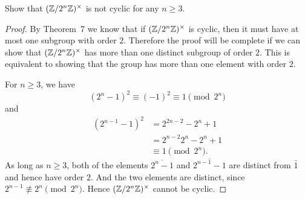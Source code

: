  Show that $(\mathbb{Z}/2^n\mathbb{Z})^\times$ is not cyclic for any
$n\geq3$.
\begin{proof}
  By Theorem~7 we know that if $(\mathbb{Z}/2^n\mathbb{Z})^\times$ is cyclic, then it
  must have at most one subgroup with order $2$. Therefore the proof
  will be complete if we can show that $(\mathbb{Z}/2^n\mathbb{Z})^\times$ has more
  than one distinct subgroup of order $2$. This is equivalent to
  showing that the group has more than one element with order $2$.

  For $n\geq3$, we have
  \begin{equation*}
    (2^n-1)^2 \equiv (-1)^2 \equiv 1 \pmod{2^n}
  \end{equation*}
  and
  \begin{align*}
    (2^{n-1}-1)^2
    &= 2^{2n-2} - 2^n + 1 \\
    &= 2^{n-2}2^n - 2^n + 1 \\
    &\equiv 1 \pmod{2^n}.
  \end{align*}
  As long as $n\geq3$, both of the elements $\overline{2^n-1}$ and
  $\overline{2^{n-1}-1}$ are distinct from $\bar1$ and hence have
  order $2$. And the two elements are distinct, since
  $2^{n-1}\not\equiv2^n\pmod{2^n}$. Hence $(\mathbb{Z}/2^n\mathbb{Z})^\times$ cannot
  be cyclic.
\end{proof}
